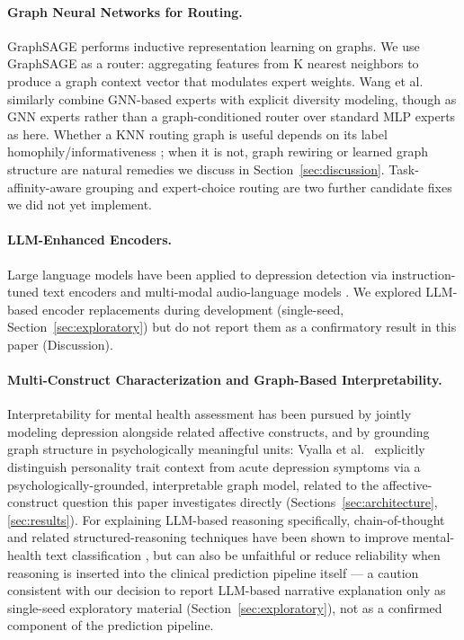 \documentclass[twocolumn]{article}
\begin{document}
\paragraph{Graph Neural Networks for Routing.} GraphSAGE \citep{graphsage2017inductive} performs inductive representation learning on graphs. We use GraphSAGE as a router: aggregating features from K nearest neighbors to produce a graph context vector that modulates expert weights. Wang et al.\ \citep{wang2023graphmoe} similarly combine GNN-based experts with explicit diversity modeling, though as GNN experts rather than a graph-conditioned router over standard MLP experts as here. Whether a KNN routing graph is useful depends on its label homophily/informativeness \citep{platonov2022characterizing}; when it is not, graph rewiring or learned graph structure \citep{attali2026graphrewiring} are natural remedies we discuss in Section~\ref{sec:discussion}. Task-affinity-aware grouping \citep{li2023boosting} and expert-choice routing \citep{zhou2022mixture} are two further candidate fixes we did not yet implement.

\paragraph{LLM-Enhanced Encoders.} Large language models have been applied to depression detection via instruction-tuned text encoders and multi-modal audio-language models \citep{zhao2025multimodalllm}. We explored LLM-based encoder replacements during development (single-seed, Section~\ref{sec:exploratory}) but do not report them as a confirmatory result in this paper (Discussion).

\paragraph{Multi-Construct Characterization and Graph-Based Interpretability.} Interpretability for mental health assessment has been pursued by jointly modeling depression alongside related affective constructs, and by grounding graph structure in psychologically meaningful units: Vyalla et al.\ \citep{vyalla2026psygat} explicitly distinguish personality trait context from acute depression symptoms via a psychologically-grounded, interpretable graph model, related to the affective-construct question this paper investigates directly (Sections~\ref{sec:architecture}, \ref{sec:results}). For explaining LLM-based reasoning specifically, chain-of-thought and related structured-reasoning techniques have been shown to improve mental-health text classification \citep{patil2025cognitivemental}, but can also be unfaithful or reduce reliability when reasoning is inserted into the clinical prediction pipeline itself \citep{wu2025cotfails} — a caution consistent with our decision to report LLM-based narrative explanation only as single-seed exploratory material (Section~\ref{sec:exploratory}), not as a confirmed component of the prediction pipeline.
\end{document}
